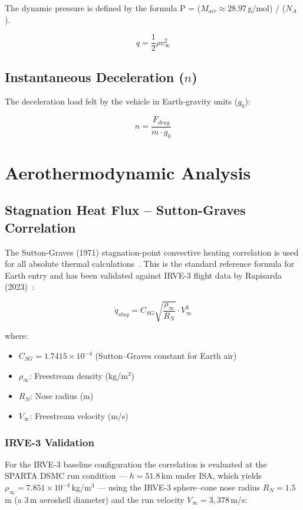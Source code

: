 The dynamic pressure is defined by the formula P = ($M_{air} \approx 28.97$\,g/mol) / ($N_A$).

\begin{equation}
    q = \frac{1}{2} \rho v_{\infty}^2
\end{equation}

\subsection{Instantaneous Deceleration (\texorpdfstring{$n$}{n})}
The deceleration load felt by the vehicle in Earth-gravity units ($g_0$):

\begin{equation}
    n = \frac{F_{drag}}{m \cdot g_0}
\end{equation}

\section{Aerothermodynamic Analysis}

\subsection{Stagnation Heat Flux -- Sutton-Graves Correlation}
The Sutton-Graves (1971) stagnation-point convective heating correlation is used for all absolute thermal calculations~\cite{sutton1971gravesh}. This is the standard reference formula for Earth entry and has been validated against IRVE-3 flight data by Rapisarda (2023)~\cite{rapisarda2023mdao}:

\begin{equation}
    \boxed{\dot{q}_{stag} = C_{SG} \sqrt{\frac{\rho_{\infty}}{R_N}} \cdot V_{\infty}^3}
\end{equation}

where:
\begin{itemize}
    \item $C_{SG} = 1.7415 \times 10^{-4}$ (Sutton--Graves constant for Earth air)

    \item $\rho_{\infty}$: Freestream density (kg/m$^3$)

    \item $R_N$: Nose radius (m)

    \item $V_{\infty}$: Freestream velocity (m/s)
\end{itemize}

\subsubsection*{IRVE-3 Validation}
For the IRVE-3 baseline configuration the correlation is evaluated at the SPARTA DSMC run condition --- $h = 51.8$\,km under ISA, which yields $\rho_{\infty} = 7.851 \times 10^{-4}$\,kg/m$^3$ --- using the IRVE-3 sphere--cone nose radius $R_N = 1.5$\,m (a 3\,m aeroshell diameter) and the run velocity $V_{\infty} = 3{,}378$\,m/s:

